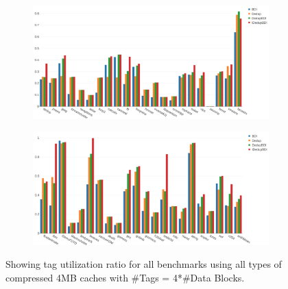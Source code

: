 \begin{figure}
    \begin{subfigure}{\textwidth}
        \includegraphics[width=\textwidth]{all-tagutil1.png}
    \end{subfigure}
    \begin{subfigure}{\textwidth}
        \includegraphics[width=\textwidth]{all-tagutil2.png}
    \end{subfigure}
    \caption[All benchmarks: Tag Utilization]{Showing tag utilization ratio for all benchmarks using all types of compressed 4MB caches with \#Tags = 4*\#Data Blocks.}
    \label{fig:all_tagutil}
\end{figure}
